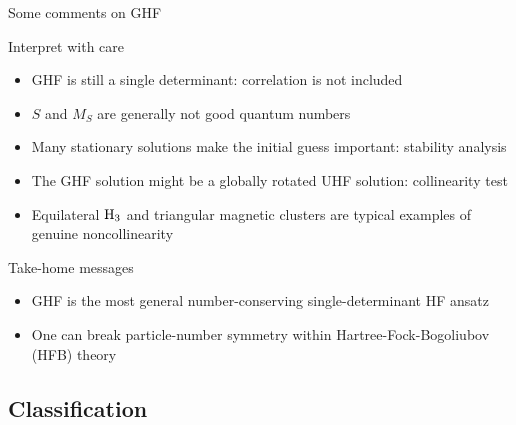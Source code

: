 \documentclass[aspectratio=169,9pt]{beamer}
\begin{document}
\begin{frame}{Some comments on GHF}
	\begin{block}{Interpret with care}
		\begin{itemize}
			\item GHF is still a single determinant: correlation is not included
			\item $S$ and $M_S$ are generally not good quantum numbers
			\item Many stationary solutions make the initial guess important: \alert{stability analysis}
			\item The GHF solution might be a globally rotated UHF solution: \alert{collinearity test}
			\item \alert{Equilateral $\ce{H3}$} and \alert{triangular magnetic clusters} are typical examples of genuine noncollinearity
		\end{itemize}
	\end{block}

	\begin{block}{Take-home messages}
		\begin{itemize}
			\item GHF is the most general \alert{number-conserving} single-determinant HF ansatz
			\item One can break particle-number symmetry within \alert{Hartree-Fock-Bogoliubov (HFB)} theory
		\end{itemize}
	\end{block}
\end{frame}
\subsection{Classification}
\end{document}
